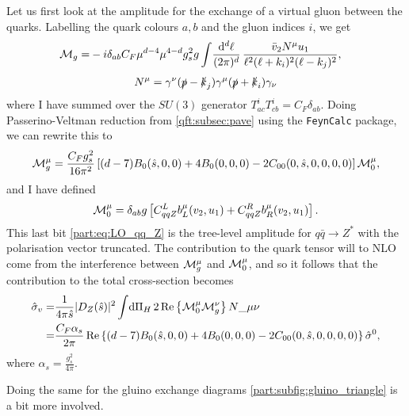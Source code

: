 \documentclass[../main.tex]{subfiles}
\begin{document}
Let us first look at the amplitude for the exchange of a virtual gluon between the quarks.
Labelling the quark colours \(a, b\) and the gluon indices \(i\), we get
\begin{align}
  \M_g = & -i\delta_{ab} C_F \mu^{d-4} \mu^{4-d} g_s^2 g \loopintegral[d]{\ell } \frac{\bar{v}_2 N^\mu u_1}{\ell^2(\ell+k_i)^2(\ell-k_j)^2},
\end{align}
\begin{align}
  N^\mu = \gamma^\nu (\slashed{p}-\slashed{k}_j) \gamma^\mu (\slashed{p}+\slashed{k}_i) \gamma_\nu
\end{align}
where I have summed over the \(SU(3)\) generator \(T_{ac}^i T_{cb}^i = C_F \delta_{ab}\).
Doing Passerino-Veltman reduction from \cref{qft:subsec:pave} using the \verb|FeynCalc| package, we can rewrite this to
\begin{equation}
  \M_g^\mu = \frac{C_F g_s^2}{16\pi^2} \bclosed{(d-7)B_0(\hat{s},0,0) + 4B_0(0,0,0) - 2C_{00}(0,\hat{s},0,0,0,0)} \M_0^\mu,
\end{equation}
and I have defined
\begin{equation}
  \label{part:eq:LO_qq_Z}
  \M_0^\mu = \delta_{ab} g \bclosed{C_{qqZ}^L b_L^\mu(v_2, u_1) + C_{qqZ}^R b_R^\mu(v_2, u_1)}.
\end{equation}
This last bit \cref{part:eq:LO_qq_Z} is the tree-level amplitude for \(q\bar{q} \to Z^\ast\) with the polarisation vector truncated.
The contribution to the quark tensor will to NLO come from the interference between \(\M_g^\mu\) and \(\M_0^\mu\), and so it follows that the contribution to the total cross-section becomes
\begin{align}
  \nonumber
  \hat\sigma_v = & \frac{1}{4\pi \hat{s}} |D_Z(\hat{s})|^2\integral{\Pi_H} 2\Re{\M_0^\mu \M_g^\nu} N\_{\mu\nu}                   \\
  =              & \frac{C_F \alpha_s}{2\pi} \Re{(d-7)B_0(\hat{s},0,0) + 4B_0(0,0,0) - 2C_{00}(0,\hat{s},0,0,0,0)} \hat\sigma^0,
\end{align}
where \(\alpha_s = \frac{g_s^2}{4\pi}\).

Doing the same for the gluino exchange diagrams \cref{part:subfig:gluino_triangle} is a bit more involved.
\end{document}
